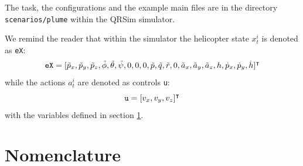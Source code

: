 \documentclass[a4paper,11pt]{report}
\newcommand{\sname}{QRSim\xspace}
\newcommand\mytexttt[1]{\texttt{\hyphenchar\font=45\relax #1}}
\begin{document}
The task, the configurations and the example main files are in the directory \mytexttt{scenarios/plume} within the \sname simulator. 

We remind the reader that within the simulator the helicopter state $x^i_t$ is denoted as \mytexttt{eX}:
$$\mytexttt{eX} = [\tilde{p}_x,\tilde{p}_y,\tilde{p}_z,\tilde{\phi},\tilde{\theta},\tilde{\psi},0,0,0,\tilde{p},\tilde{q},\tilde{r},0,\tilde{a}_x,\tilde{a}_y,\tilde{a}_z,h,\dot{p}_x,\dot{p}_y,\dot{h}]^\intercal$$
while the actions $a^i_t$ are denoted as controls \mytexttt{u}:
$$\mytexttt{u}=[v_x,v_y,v_z]^\intercal$$
with the variables defined in section \ref{tab:naming}.

\newpage


\section{Nomenclature}\label{tab:naming}
\end{document}
